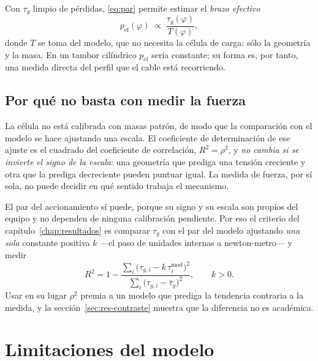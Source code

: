 Con $\tau_g$ limpio de pérdidas, \eqref{eq:par} permite estimar el \emph{brazo efectivo}
\begin{equation}
  p_{\text{ef}}(\varphi) \;\propto\; \frac{\tau_g(\varphi)}{T(\varphi)},
  \label{eq:brazo-efectivo}
\end{equation}
donde $T$ se toma del modelo, que no necesita la célula de carga: sólo la geometría y la masa. En un
tambor cilíndrico $p_{\text{ef}}$ sería constante; su forma es, por tanto, una medida directa del
perfil que el cable está recorriendo.

\subsection{Por qué no basta con medir la fuerza}
\label{sec:mod-ambiguedad}

La célula no está calibrada con masas patrón, de modo que la comparación con el modelo se hace
ajustando una escala. El coeficiente de determinación de ese ajuste es el cuadrado del coeficiente de
correlación, $R^2 = \rho^2$, y \emph{no cambia si se invierte el signo de la escala}: una geometría
que prediga una tensión creciente y otra que la prediga decreciente pueden puntuar igual. La medida
de fuerza, por sí sola, no puede decidir en qué sentido trabaja el mecanismo.

El par del accionamiento sí puede, porque su signo y su escala son propios del equipo y no dependen
de ninguna calibración pendiente. Por eso el criterio del capítulo~\ref{chap:resultados} es comparar
$\tau_g$ con el par del modelo ajustando \emph{una sola} constante positiva $k$ ---el paso de
unidades internas a newton-metro--- y medir
\begin{equation}
  R^2 = 1 - \frac{\sum_i \big(\tau_{g,i} - k\,\tau_i^{\text{mod}}\big)^2}
                 {\sum_i \big(\tau_{g,i} - \bar\tau_g\big)^2}, \qquad k>0 .
  \label{eq:r2-par}
\end{equation}
Usar en su lugar $\rho^2$ premia a un modelo que prediga la tendencia contraria a la medida, y la
sección~\ref{sec:res-contraste} muestra que la diferencia no es académica.

\section{Limitaciones del modelo}

